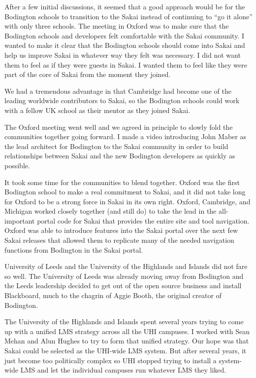 \documentclass[12pt]{book}
\begin{document}
After a few initial discussions, it seemed that a good approach would
be for the Bodington schools to transition to the Sakai instead
of continuing to ``go it alone'' with only three schools.  The meeting
in Oxford was to make sure that the Bodington schools and developers
felt comfortable with the Sakai community.  I wanted to make it
clear that the Bodington schools should come into Sakai and help
us improve Sakai in whatever way they felt was necessary.   I did not
want them to feel as if they were guests in Sakai.  I wanted them to
feel like they were part of the core of Sakai from the moment they
joined.

We had a tremendous advantage in that Cambridge had become one of the leading
worldwide contributors to Sakai, so the Bodington schools could work
with a fellow UK school as their mentor as they joined Sakai.

The Oxford meeting went well and we agreed in principle to slowly
fold the communities together going forward.  I made a video introducing
John Maber as the lead architect for Bodington to the Sakai community
in order to build relationships between Sakai and the new Bodington
developers as quickly as possible.

It took some time for the communities to blend together.  Oxford was the first
Bodington
school to make a real commitment to Sakai, and it did not take long
for Oxford to be a strong force in Sakai in its own right.  Oxford, Cambridge,
and Michigan worked closely together (and still do) to take the lead in the
all-important portal code for Sakai that provides the entire site and
tool navigation.  Oxford was able to introduce features into the Sakai
portal over the next few Sakai releases that allowed them to replicate
many of the needed navigation functions from Bodington in the Sakai portal.

University of Leeds and the University of the Highlands and Islands did not fare
so well.  The University of Leeds was already moving away from Bodington and
the Leeds leadership decided to get out of the open source
business and install Blackboard, much to the chagrin of Aggie Booth, the
original creator of Bodington.

The University of the Highlands and Islands spent several years trying
to come up with a unified LMS strategy across all the UHI campuses.
I worked with Sean Mehan and Alun Hughes to try to form that unified
strategy.
Our hope was that Sakai could be selected as the UHI-wide LMS system.
But after several years, it just become too politically complex
so UHI stopped trying to install a system-wide
LMS and let the individual campuses run whatever LMS they liked.
\end{document}
